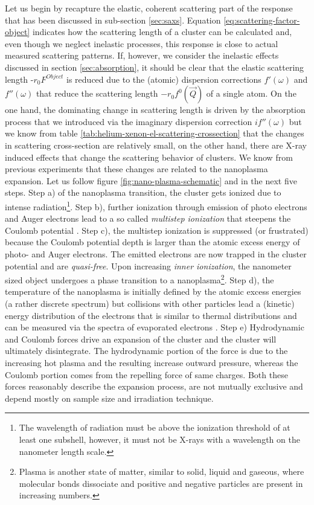  Let us begin by recapture the elastic, coherent scattering part of the response that has been discussed in sub-section \ref{sec:saxs}. Equation \eqref{eq:scattering-factor-object} indicates how the scattering length of a cluster can be calculated and, even though we neglect inelastic processes, this response is close to actual measured scattering patterns. If, however, we consider the inelastic effects discussed in section \ref{sec:absorption}, it should be clear that the elastic scattering length -$r_{0}F^{Object}$ is reduced due to the (atomic) dispersion corrections $f'\left(\omega\right)$ and $f''\left(\omega\right)$ that reduce the scattering length $-r_{0}f^{0}\left(\vec{Q}\right)$ of a single atom. On the one hand, the dominating change in scattering length is driven by the absorption process that we introduced via the imaginary dispersion correction $i f''\left(\omega\right)$ but we know from table \ref{tab:helium-xenon-el-scattering-crossection} that the changes in scattering cross-section are relatively small, on the other hand, there are X-ray induced effects that change the scattering behavior of clusters. We know from previous experiments that these changes are related to the nanoplasma expansion. Let us follow figure \ref{fig:nano-plasma-schematic} and \citep{Arbeiter-2011-NJP,Bostedt-2010-JPB} in the next five steps. Step a) of the nanoplasma transition, the cluster gets ionized due to intense radiation\footnote{The wavelength of radiation must be above the ionization threshold of at least one subshell, however, it must not be X-rays with a wavelength on the nanometer length scale.}. Step b), further ionization through emission of photo electrons and Auger electrons lead to a so called \textit{multistep ionization} that steepens the Coulomb potential \citep{Wabnitz-2002-Nature,Laarmann-2004-PRL,Bostedt-2008-PRL}. Step c), the multistep ionization is suppressed (or frustrated) because the Coulomb potential depth is larger than the atomic excess energy of photo- and Auger electrons. The emitted electrons are now trapped in the cluster potential and are \textit{quasi-free}. Upon increasing \textit{inner ionization}, the nanometer sized object undergoes a phase transition to a nanoplasma\footnote{Plasma is another state of matter, similar to solid, liquid and gaseous, where molecular bonds dissociate and positive and negative particles are present in increasing numbers.}. Step d), the temperature of the nanoplasma is initially defined by the atomic excess energies (a rather discrete spectrum) but collisions with other particles lead a (kinetic) energy distribution of the electrons that is similar to thermal distributions and can be measured via the spectra of evaporated electrons \citep{Laarmann-2005-PRL,Bostedt-2010-NJP}. Step e) Hydrodynamic and Coulomb forces drive an expansion of the cluster and the cluster will ultimately disintegrate. The hydrodynamic portion of the force is due to the increasing hot plasma and the resulting increase outward pressure, whereas the Coulomb portion comes from the repelling force of same charges. Both these forces reasonably describe the expansion process, are not mutually exclusive and depend mostly on sample size and irradiation technique.\\
